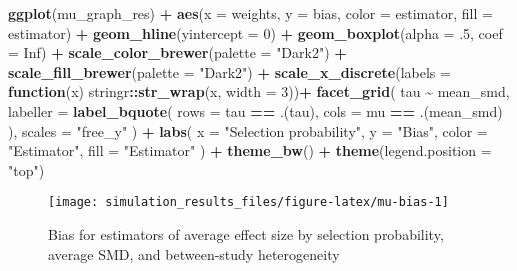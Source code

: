 \documentclass[
]{article}
\newenvironment{Shaded}{\begin{snugshade}}{\end{snugshade}}
\newcommand{\AttributeTok}[1]{\textcolor[rgb]{0.13,0.29,0.53}{#1}}
\newcommand{\ConstantTok}[1]{\textcolor[rgb]{0.56,0.35,0.01}{#1}}
\newcommand{\ControlFlowTok}[1]{\textcolor[rgb]{0.13,0.29,0.53}{\textbf{#1}}}
\newcommand{\DecValTok}[1]{\textcolor[rgb]{0.00,0.00,0.81}{#1}}
\newcommand{\FunctionTok}[1]{\textcolor[rgb]{0.13,0.29,0.53}{\textbf{#1}}}
\newcommand{\NormalTok}[1]{#1}
\newcommand{\SpecialCharTok}[1]{\textcolor[rgb]{0.81,0.36,0.00}{\textbf{#1}}}
\newcommand{\StringTok}[1]{\textcolor[rgb]{0.31,0.60,0.02}{#1}}
\begin{document}
\begin{Shaded}
\begin{Highlighting}[]
\FunctionTok{ggplot}\NormalTok{(mu\_graph\_res) }\SpecialCharTok{+} 
  \FunctionTok{aes}\NormalTok{(}\AttributeTok{x =}\NormalTok{ weights, }\AttributeTok{y =}\NormalTok{ bias, }\AttributeTok{color =}\NormalTok{ estimator, }\AttributeTok{fill =}\NormalTok{ estimator) }\SpecialCharTok{+}
  \FunctionTok{geom\_hline}\NormalTok{(}\AttributeTok{yintercept =} \DecValTok{0}\NormalTok{) }\SpecialCharTok{+}
  \FunctionTok{geom\_boxplot}\NormalTok{(}\AttributeTok{alpha =}\NormalTok{ .}\DecValTok{5}\NormalTok{, }\AttributeTok{coef =} \ConstantTok{Inf}\NormalTok{) }\SpecialCharTok{+}
  \FunctionTok{scale\_color\_brewer}\NormalTok{(}\AttributeTok{palette =} \StringTok{"Dark2"}\NormalTok{) }\SpecialCharTok{+}
  \FunctionTok{scale\_fill\_brewer}\NormalTok{(}\AttributeTok{palette =} \StringTok{"Dark2"}\NormalTok{) }\SpecialCharTok{+}
  \FunctionTok{scale\_x\_discrete}\NormalTok{(}\AttributeTok{labels =} \ControlFlowTok{function}\NormalTok{(x) stringr}\SpecialCharTok{::}\FunctionTok{str\_wrap}\NormalTok{(x, }\AttributeTok{width =} \DecValTok{3}\NormalTok{))}\SpecialCharTok{+}
  \FunctionTok{facet\_grid}\NormalTok{(}
\NormalTok{    tau }\SpecialCharTok{\textasciitilde{}}\NormalTok{ mean\_smd, }
    \AttributeTok{labeller =} \FunctionTok{label\_bquote}\NormalTok{(}
      \AttributeTok{rows =}\NormalTok{ tau }\SpecialCharTok{==}\NormalTok{ .(tau),}
      \AttributeTok{cols =}\NormalTok{ mu }\SpecialCharTok{==}\NormalTok{ .(mean\_smd)}
\NormalTok{    ),}
    \AttributeTok{scales =} \StringTok{"free\_y"}
\NormalTok{  ) }\SpecialCharTok{+}
  \FunctionTok{labs}\NormalTok{(}
    \AttributeTok{x =} \StringTok{"Selection probability"}\NormalTok{, }
    \AttributeTok{y =} \StringTok{"Bias"}\NormalTok{, }
    \AttributeTok{color =} \StringTok{"Estimator"}\NormalTok{,}
    \AttributeTok{fill =} \StringTok{"Estimator"}
\NormalTok{  ) }\SpecialCharTok{+} 
  \FunctionTok{theme\_bw}\NormalTok{() }\SpecialCharTok{+}
  \FunctionTok{theme}\NormalTok{(}\AttributeTok{legend.position =} \StringTok{"top"}\NormalTok{)}
\end{Highlighting}
\end{Shaded}

\begin{sidewaysfigure}
\texttt{[image: simulation\_results\_files/figure-latex/mu-bias-1]} \caption{Bias for estimators of average effect size by selection probability, average SMD, and between-study heterogeneity}\label{fig:mu-bias}
\end{sidewaysfigure}
\end{document}
